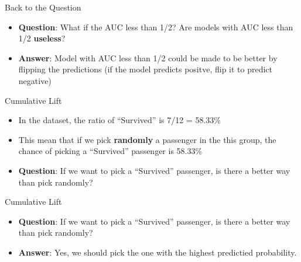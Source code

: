 \documentclass[
  ignorenonframetext,
]{beamer}
\providecommand{\tightlist}{%
  \setlength{\itemsep}{0pt}\setlength{\parskip}{0pt}}
\begin{document}
\begin{frame}{Back to the Question}
\protect\hypertarget{back-to-the-question}{}

\begin{itemize}
\item
  \textbf{Question}: What if the AUC less than 1/2? Are models with AUC
  less than 1/2 \textbf{useless}?
\item
  \textbf{Answer}: Model with AUC less than 1/2 could be made to be
  better by flipping the predictions (if the model predicts positve,
  flip it to predict negative)
\end{itemize}

\end{frame}

\begin{frame}{Cumulative Lift}
\protect\hypertarget{cumulative-lift}{}

\begin{itemize}
\tightlist
\item
  In the dataset, the ratio of ``Survived'' is 7/12 = 58.33\%
\item
  This mean that if we pick \textbf{randomly} a passenger in the this
  group, the chance of picking a ``Survived'' passenger is 58.33\%
\item
  \textbf{Question}: If we want to pick a ``Survived'' passenger, is
  there a better way than pick randomly?
\end{itemize}

\end{frame}

\begin{frame}{Cumulative Lift}
\protect\hypertarget{cumulative-lift-1}{}

\begin{itemize}
\tightlist
\item
  \textbf{Question}: If we want to pick a ``Survived'' passenger, is
  there a better way than pick randomly?
\item
  \textbf{Answer}: Yes, we should pick the one with the highest
  predictied probability.
\end{itemize}

\end{frame}
\end{document}
